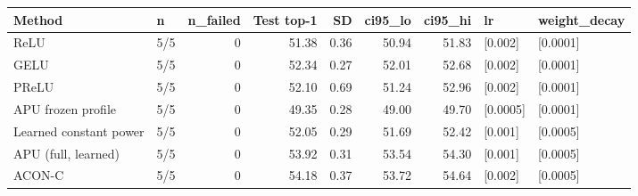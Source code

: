 \begin{tabular}{llrrrrrll}
\toprule
Method & n & n\_failed & Test top-1 & SD & ci95\_lo & ci95\_hi & lr & weight\_decay \\
\midrule
ReLU & 5/5 & 0 & 51.38 & 0.36 & 50.94 & 51.83 & [0.002] & [0.0001] \\
GELU & 5/5 & 0 & 52.34 & 0.27 & 52.01 & 52.68 & [0.002] & [0.0001] \\
PReLU & 5/5 & 0 & 52.10 & 0.69 & 51.24 & 52.96 & [0.002] & [0.0001] \\
APU frozen profile & 5/5 & 0 & 49.35 & 0.28 & 49.00 & 49.70 & [0.0005] & [0.0001] \\
Learned constant power & 5/5 & 0 & 52.05 & 0.29 & 51.69 & 52.42 & [0.001] & [0.0005] \\
APU (full, learned) & 5/5 & 0 & 53.92 & 0.31 & 53.54 & 54.30 & [0.001] & [0.0005] \\
ACON-C & 5/5 & 0 & 54.18 & 0.37 & 53.72 & 54.64 & [0.002] & [0.0005] \\
\bottomrule
\end{tabular}

